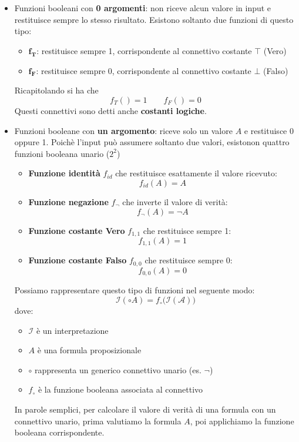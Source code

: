 \begin{itemize}
    \item Funzioni booleani con \textbf{0 argomenti}: non riceve alcun valore in input e restituisce sempre lo stesso risultato. Esistono soltanto due funzioni di questo tipo:
    \begin{itemize}
        \item $\bm{f_T}$: restituisce sempre 1, corrispondente al connettivo costante $\top$ (Vero)
        \item $\bm{f_F}$: restituisce sempre 0, corrispondente al connettivo costante $\bot$ (Falso)
    \end{itemize}
    Ricapitolando si ha che 
    \[      f_T() = 1 \qquad f_F() = 0  \]
Questi connettivi sono detti anche \textbf{costanti logiche}.

    \item Funzioni booleane con \textbf{un argomento}: riceve solo un valore $A$ e restituisce 0 oppure 1. Poichè l'input può assumere soltanto due valori, esistonon quattro funzioni booleana unario ($2^2$)
    \begin{itemize}
        \item \textbf{Funzione identità} $f_{id}$ che restituisce esattamente il valore ricevuto:
        \[ f_{id}(A) = A  \]
        \item \textbf{Funzione negazione} $f_{\neg}$ che inverte il valore di verità:
        \[  f_{\neg}(A) = \neg A     \]
        \item \textbf{Funzione costante Vero} $f_{1,1}$ che restituisce sempre 1:
        \[   f_{1,1}(A) = 1     \]
        \item \textbf{Funzione costante Falso} $f_{0,0}$ che restituisce sempre 0:
        \[    f_{0,0}(A) = 0    \]
    \end{itemize}
Possiamo rappresentare questo tipo di funzioni nel seguente modo:
\[     \mathcal{I}(\circ A) = f_{\circ}\big(\mathcal{I(A)}\big)  \]
dove:
\begin{itemize}
    \item $\mathcal{I}$ è un interpretazione
    \item $A$ è una formula proposizionale
    \item $\circ$ rappresenta un generico connettivo unario (es. $\neg$)
    \item $f_{\circ}$ è la funzione booleana associata al connettivo 
\end{itemize}
In parole semplici, per calcolare il valore di verità di una formula con un connettivo unario, prima valutiamo la formula \(A\), poi applichiamo la funzione booleana corrispondente.




\end{itemize}

